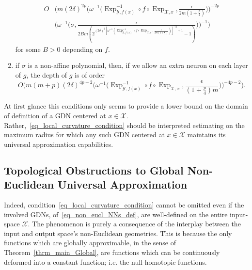 \documentclass[anon,12pt]{colt2021} %
\newcommand{\xxx}{\mathcal{X}}
\newcommand{\yyy}{\mathcal{Y}}
\begin{document}
\begin{theorem}
\begin{enumerate}[label=(i),leftmargin=1.75em]
\begin{align}
        O &\bigg( m (2\delta)^{2p} \bigg(\omega^{-1} \big(\operatorname{Exp}_{\yyy,f(x)}^{-1} \circ f \circ \operatorname{Exp}_{\xxx,x}, \frac{\epsilon}{2m(1+\frac{p}{4})} \big) \bigg)^{-2p} \nonumber \\
        &\bigg( \omega^{-1} \big( \sigma, \frac{\epsilon}{2Bm(2^{(2\delta)^{2}[\omega^{-1}(\operatorname{Exp}_{\yyy,f(x)}^{-1} \circ f \circ \operatorname{Exp}_{\xxx,x}, \frac{\epsilon}{2m(1+\frac{p}{4})})]^{-2}+1} -1)} \big) \bigg)^{-1}\bigg)
    \end{align}
    for some $B > 0$ depending on $f$.
    \item if $\sigma$ is a non-affine polynomial, then, if we allow an extra neuron on each layer of $g$, the depth of $g$ is of order
    \begin{equation}
        O \bigg(m(m+p)(2\delta)^{4p+2}\bigg(\omega^{-1} \big(\operatorname{Exp}_{\yyy,f(x)}^{-1} \circ f \circ \operatorname{Exp}_{\xxx,x}, \frac{\epsilon}{(1+\frac{p}{4})m} \big) \bigg)^{-4p-2} \bigg).
    \end{equation}
\end{enumerate}
\end{theorem}
At first glance this conditions only seems to provide a lower bound on the domain of definition of a GDN centered at $x \in \xxx$.   Rather,~\eqref{eq_local_curvature_condition} should be interpreted estimating on the maximum radius for which any such GDN centered at $x \in \xxx$ maintains its universal approximation capabilities.  

\subsection{Topological Obstructions to Global Non-Euclidean Universal Approximation}\label{ss_Main_Obstructions}
Indeed, condition~\eqref{eq_local_curvature_condition} cannot be omitted even if the involved GDNs, of~\eqref{eq_non_eucl_NNs_def}, are well-defined on the entire input-space $\xxx$.  The phenomenon is purely a consequence of the interplay between the input and output space's non-Euclidean geometries.  This is because the only functions which are globally approximable, in the sense of Theorem~\ref{thrm_main_Global}, are functions which can be continuously deformed into a constant function; i.e. the null-homotopic functions.  
\end{document}
